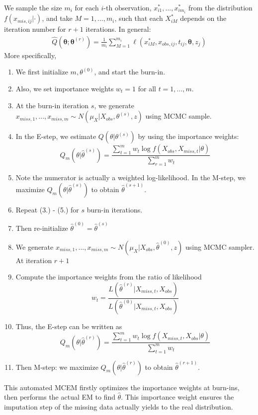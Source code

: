 \documentclass[preprint,12pt]{elsarticle}
\begin{document}
We sample the size $m_i$ for each $i$-th observation, $x_{i1}^*,...,x_{im_i}^*$ from the distribution $f(x_{mis,ij}|\cdot)$, and take $M = 1,...,m_i$, such that each $X_{iM}^*$ depends on the iteration number for $r+1$ iterations. In general:
\begin{align}
    \hat{Q}(\boldsymbol{\theta}; \boldsymbol{\theta}^{(r)})=\frac{1}{m_i}\sum_{M=1}^{m_i}\ell(x_{iM}^*, x_{obs,ij},t_{ij}, \boldsymbol{\theta},z_j)
\end{align}
More specifically, 
\begin{enumerate}
    \item We first initialize $m, \theta^{(0)}$, and start the burn-in.
    \item Also, we set importance weights $w_t=1$ for all $t=1,...,m$.
    \item At the burn-in iteration $s$, we generate $x_{miss,1}, ..., x_{miss,m}\sim N(\mu_{X}|X_{obs}, \theta^{(s)}, z)$ using MCMC sample.
    \item In the E-step, we estimate $Q(\theta|\theta^{(s)})$ by using the importance weights:
    \begin{equation}
        Q_m(\theta|\hat{\theta}^{(s)})=\frac{\sum_{t=1}^m w_t\log f(X_{obs}, X_{miss,t}|\theta)}{\sum_{r=1}^mw_t}
    \end{equation}
    \item Note the numerator is actually a weighted log-likelihood. In the M-step, we maximize $Q_m(\theta|\hat{\theta}^{(s)})$ to obtain $\hat{\theta}^{(s+1)}$. 
    \item Repeat (3.) - (5.) for $s$ burn-in iterations.
    \item Then re-initialize $\hat{\theta}^{(0)}=\hat{\theta}^{(s)}$
    \item We generate $x_{miss,1},...,x_{miss,m}\sim N(\mu_{X}|X_{obs}, \hat{\theta}^{(0)}, z)$ using MCMC sampler. At iteration $r+1$
    \item Compute the importance weights from the ratio of likelihood
    \begin{equation}
        w_t=\frac{L(\hat{\theta}^{(r)}|X_{miss,t}, X_{obs})}{L(\hat{\theta}^{(0)}|X_{miss,t}, X_{obs})}
    \end{equation}
    \item Thus, the E-step can be written as 
    \begin{equation}
        Q_m(\theta|\hat{\theta}^{(r)})=\frac{\sum_{t=1}^mw_t\log f(X_{miss,t}, X_{obs}|\theta)}{\sum_{t=1}^m w_t}
    \end{equation}
    \item Then M-step: we maximize $Q_m(\theta|\hat{\theta}^{(r)})$ to obtain $\hat{\theta}^{(r+1)}$. 
\end{enumerate}
This automated MCEM firstly optimizes the importance weights at burn-ins, then performs the actual EM to find $\hat{\theta}$. This importance weight ensures the imputation step of the missing data actually yields to the real distribution. 
   
\end{document}
